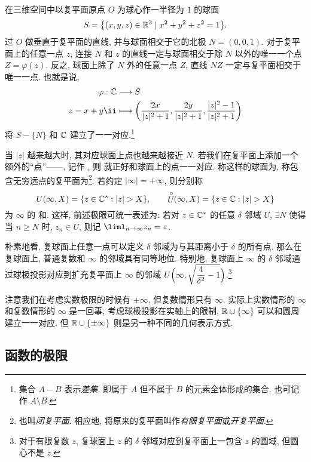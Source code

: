 在三维空间中以复平面原点 $O$ 为球心作一半径为 $1$ 的球面
\[
  S={\left\{(x,y,z)\in{\mathbb{R}}^3\mid x^2+y^2+z^2=1\right\}}.
\]
过 $O$ 做垂直于复平面的直线, 并与球面相交于它的北极 $N=(0,0,1)$.
对于复平面上的任意一点 $z$, 连接 $N$ 和 $z$ 的直线一定与球面相交于除 $N$ 以外的唯一一个点 $Z=\varphi(z)$.
反之, 球面上除了 $N$ 外的任意一点 $Z$, 直线 $NZ$ 一定与复平面相交于唯一一点.
也就是说, 
\begin{equation}
  \label{eq:polar-project}
  \begin{aligned}
    \varphi:\BC&\lra S\\
    z=x+y\ii&\lto \biggl(\frac{2x}{|z|^2+1},\frac{2y}{|z|^2+1},\frac{|z|^2-1}{|z|^2+1}\biggr)
  \end{aligned}
\end{equation}
将 $S-\{N\}$ 和 ${\mathbb{C}}$ 建立了一一对应.\footnote{
  集合 $A-B$ 表示\emph{差集}, 即属于 $A$ 但不属于 $B$ 的元素全体形成的集合.
  也可记作 $A\setminus B$.
}

当 $|z|$ 越来越大时, 其对应球面上点也越来越接近 $N$.
若我们在复平面上添加一个额外的``点''——, 记作 \noun{$\infty$}, 则 就正好和球面上的点一一对应.
称这样的球面为, 称包含无穷远点的复平面为\footnote{
  也叫\emph{闭复平面}. 相应地, 将原来的复平面叫作\emph{有限复平面}或\emph{开复平面}.
}.
若约定 $|\infty|=+\infty$, 则分别称
\[
  U(\infty,X)=\{z\in\BC^*:|z|>X\},\qquad
  \Uc(\infty,X)=\{z\in\BC:|z|>X\}
\]
为 $\infty$ 的 和.
这样, 前述极限可统一表述为: 若对 $z\in{\mathbb{C}}^*$ 的任意 $\delta$ 邻域 $U$, $\exists N$ 使得当 $n\ge N$ 时, $z_n\in U$, 则记 $\liml_{n\ra\infty}z_n=z$.

朴素地看, 复球面上任意一点可以定义 $\delta$ 邻域为与其距离小于 $\delta$ 的所有点.
那么在复球面上, 普通复数和 $\infty$ 的邻域具有同等地位.
特别地, 复球面上 $\infty$ 的 $\delta$ 邻域通过球极投影对应到扩充复平面上 $\infty$ 的邻域
$U\Bigl(\infty, \sqrt{\dfrac4{\delta^2}-1}\Bigr)$.\footnote{
  对于有限复数 $z$, 复球面上 $z$ 的 $\delta$ 邻域对应到复平面上一包含 $z$ 的圆域, 但圆心不是 $z$.
}

注意我们在考虑实数极限的时候有 $\pm\infty$, 但复数情形只有 $\infty$.
实际上实数情形的 $\infty$ 和复数情形的 $\infty$ 是一回事, 考虑球极投影在实轴上的限制, ${\mathbb{R}}\cup\{\infty\}$ 可以和圆周建立一一对应.
但 ${\mathbb{R}}\cup\{\pm\infty\}$ 则是另一种不同的几何表示方式.


\subsection{函数的极限}

